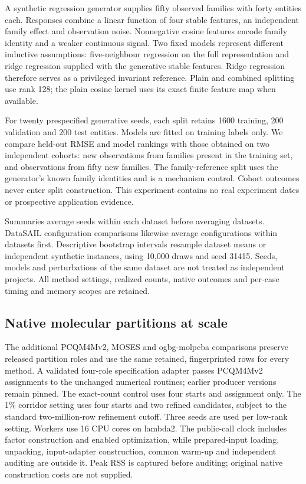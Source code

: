 \documentclass[12pt]{article}
\begin{document}
A synthetic regression generator supplies fifty observed families with forty
entities each. Responses combine a linear function of four stable features, an
independent family effect and observation noise. Nonnegative cosine features
encode family identity and a weaker continuous signal. Two fixed models
represent different inductive assumptions: five-neighbour regression on the
full representation and ridge regression supplied with the generative stable
features. Ridge regression therefore serves as a privileged invariant
reference. Plain and combined splitting use rank 128; the plain cosine kernel
uses its exact finite feature map when available.

For twenty prespecified generative seeds, each split retains 1600 training, 200
validation and 200 test entities. Models are fitted on training labels only. We
compare held-out RMSE and model rankings with those obtained on two independent
cohorts: new observations from families present in the training set, and
observations from fifty new families. The family-reference split uses the
generator's known family identities and is a mechanism control. Cohort outcomes
never enter split construction. This experiment contains no real experiment
dates or prospective application evidence.

Summaries average seeds within each dataset before averaging datasets. DataSAIL
configuration comparisons likewise average configurations within datasets
first. Descriptive bootstrap intervals resample dataset means or independent
synthetic instances, using 10,000 draws and seed 31415. Seeds, models and
perturbations of the same dataset are not treated as independent projects. All
method settings, realized counts, native outcomes and per-case timing and
memory scopes are retained.



\subsection{Native molecular partitions at scale}

The additional PCQM4Mv2, MOSES and ogbg-molpcba comparisons preserve released
partition roles and use the same retained, fingerprinted rows for every method.
A validated four-role specification adapter passes PCQM4Mv2 assignments to the
unchanged numerical routines; earlier producer versions remain pinned. The
exact-count control uses four starts and assignment only. The 1\% corridor
setting uses four starts and two refined candidates, subject to the standard
two-million-row refinement cutoff. Three seeds are used per low-rank setting.
Workers use 16 CPU cores on lambda2. The public-call clock includes factor
construction and enabled optimization, while prepared-input loading, unpacking,
input-adapter construction, common warm-up and independent auditing are outside
it. Peak RSS is captured before auditing; original native construction costs
are not supplied.
\end{document}
